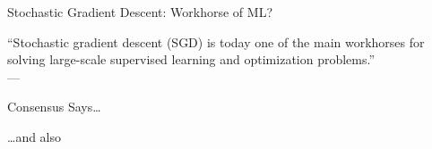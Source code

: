 \documentclass[notheorems]{beamer}
\begin{document}
\begin{frame}

    \end{frame}

    \begin{frame}{Stochastic Gradient Descent: Workhorse of ML?}

        \begin{center}
            \Large
            ``Stochastic gradient descent (SGD) is today one of the main workhorses for solving large-scale supervised learning and optimization problems.''\\
            ---\citet{drori2019complexity}
        \end{center}

    \end{frame}

    \begin{frame}{Consensus Says\ldots}

        \begin{center}
            \Large \dots and also ~\citet{xu2017second,
            zhang2016parallel,
            patterson2017deep,
            pillaud2018statistical,
            grosse2015scaling,
            assran2018stochastic,
            damaskinos2019aggregathor,
            kawaguchi2020ordered,
            bernstein2018signsgd,
            li2019rsa,
            agarwal2017second,
            hofmann2015variance,
            geffner2019rule,
            assran2020convergence,
            gower2019sgd}
        \end{center}

    \end{frame}
\end{document}
